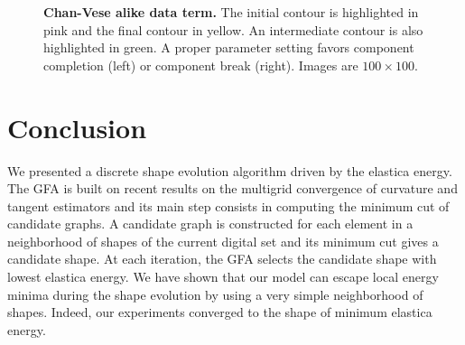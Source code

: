 \documentclass[review]{siamart220329}
\begin{document}
\begin{figure}
\center
{}\hspace{1em}%
%
\caption{\textbf{Chan-Vese alike data term.} The initial contour is highlighted in pink and the final contour in yellow. An intermediate contour is also highlighted in green. A proper parameter setting favors component completion (left) or component break (right). Images are $100\times100$. }
\label{fig:GF-chan-vese-alike}
\end{figure}
%
%
%
%
\section{Conclusion}
%
%
We presented a discrete shape evolution algorithm driven by the elastica energy. The GFA is built on recent results on the multigrid convergence of curvature and tangent estimators and its main step consists in computing the minimum cut of candidate graphs. A candidate graph is constructed for each element in a neighborhood of shapes of the current digital set and its minimum cut gives a candidate shape. At each iteration, the GFA selects the candidate shape with lowest elastica energy. We have shown that our model can escape local energy minima during the shape evolution by using a very simple neighborhood of shapes. Indeed, our experiments converged to the shape of minimum elastica energy. 
\end{document}

